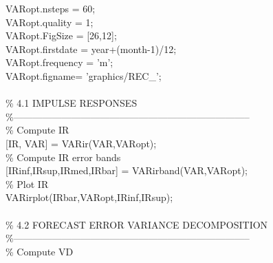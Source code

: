 \hspace{1mm}VARopt.nsteps = 60; \\ 
\hspace{1mm}VARopt.quality = 1; \\ 
\hspace{1mm}VARopt.FigSize = [26,12]; \\ 
\hspace{1mm}VARopt.firstdate = year+(month-1)/12; \\ 
\hspace{1mm}VARopt.frequency = \textcolor{matlabpurple}{'m'}; \\ 
\hspace{1mm}VARopt.figname= \textcolor{matlabpurple}{'graphics/REC\_'}; \\ 
\hspace{1mm} \\ 
\hspace{1mm}\textcolor{matlabgreen}{\% 4.1 IMPULSE RESPONSES }\\ 
\hspace{1mm}\textcolor{matlabgreen}{\%--------------------------------------------------------------------------  }\\ 
\hspace{1mm}\textcolor{matlabgreen}{\% Compute IR }\\ 
\hspace{1mm}[IR, VAR] = VARir(VAR,VARopt); \\ 
\hspace{1mm}\textcolor{matlabgreen}{\% Compute IR error bands }\\ 
\hspace{1mm}[IRinf,IRsup,IRmed,IRbar] = VARirband(VAR,VARopt); \\ 
\hspace{1mm}\textcolor{matlabgreen}{\% Plot IR }\\ 
\hspace{1mm}VARirplot(IRbar,VARopt,IRinf,IRsup); \\ 
\hspace{1mm} \\ 
\hspace{1mm}\textcolor{matlabgreen}{\% 4.2 FORECAST ERROR VARIANCE DECOMPOSITION }\\ 
\hspace{1mm}\textcolor{matlabgreen}{\%--------------------------------------------------------------------------  }\\ 
\hspace{1mm}\textcolor{matlabgreen}{\% Compute VD }\\ 
